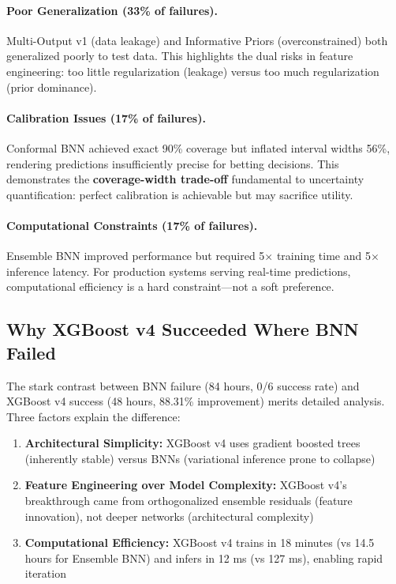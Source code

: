 \paragraph{Poor Generalization (33\% of failures).}
Multi-Output v1 (data leakage) and Informative Priors (overconstrained) both generalized poorly to test data. This highlights the dual risks in feature engineering: too little regularization (leakage) versus too much regularization (prior dominance).

\paragraph{Calibration Issues (17\% of failures).}
Conformal BNN achieved exact 90\% coverage but inflated interval widths 56\%, rendering predictions insufficiently precise for betting decisions. This demonstrates the \textbf{coverage-width trade-off} fundamental to uncertainty quantification: perfect calibration is achievable but may sacrifice utility.

\paragraph{Computational Constraints (17\% of failures).}
Ensemble BNN improved performance but required 5$\times$ training time and 5$\times$ inference latency. For production systems serving real-time predictions, computational efficiency is a hard constraint---not a soft preference.

\subsection{Why XGBoost v4 Succeeded Where BNN Failed}

The stark contrast between BNN failure (84 hours, 0/6 success rate) and XGBoost v4 success (48 hours, 88.31\% improvement) merits detailed analysis. Three factors explain the difference:

\begin{enumerate}[itemsep=2pt,parsep=0pt]
    \item \textbf{Architectural Simplicity:} XGBoost v4 uses gradient boosted trees (inherently stable) versus BNNs (variational inference prone to collapse)

    \item \textbf{Feature Engineering over Model Complexity:} XGBoost v4's breakthrough came from orthogonalized ensemble residuals (feature innovation), not deeper networks (architectural complexity)

    \item \textbf{Computational Efficiency:} XGBoost v4 trains in 18 minutes (vs 14.5 hours for Ensemble BNN) and infers in 12 ms (vs 127 ms), enabling rapid iteration
\end{enumerate}

